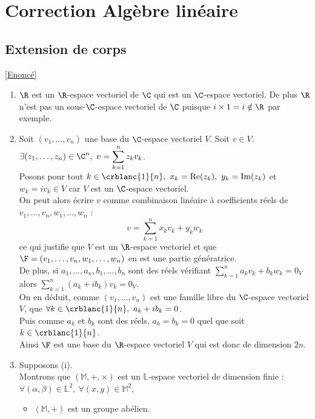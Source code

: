 \documentclass[8pt]{book}
\begin{document}
\section{Correction Algèbre linéaire}
	\subsection{Extension de corps }
	\label{Extension de corps corrigé}
	\textcolor{blue}{\hyperref[Extension de corps]{[Enoncé]}}\\
	\begin{enumerate}[leftmargin=*]
		\item $\R$ est un $\R$-espace vectoriel de $\C$ qui est un $\C$-espace vectoriel. De plus $\R$ n'est pas un sous-$\C$-espace vectoriel de $\C$ puisque $i\times 1=i\notin \R$ par exemple.
		\item Soit $(v_1,\dots,v_n)$ une base du $\C$-espace vectoriel $V$. Soit $v\in V$.\\
		$\exists (z_1,\dots,z_n)\in \C^n,\ v=\displaystyle\sum_{k=1}^nz_kv_k$.\\
		Posons pour tout $k\in \crblanc{1}{n},\ x_k=\operatorname{Re}(z_k),\ y_k=\operatorname{Im}(z_k)$ et $w_k=iv_k\in V$ car $V$ est un $\C$-espace vectoriel.\\
		On peut alors écrire $v$ comme combinaison linéaire à coefficients réels de $v_1,\dots,v_n,w_1,\dots,w_n$ :
		$$v=\sum_{k=1}^nx_kv_k+y_kw_k$$
		ce qui justifie que $V$ est un $\R$-espace vectoriel et que $\F=(v_1,\dots,v_n,w_1,\dots,w_n)$ en est une partie génératrice.\\
		De plus, si $a_1,\dots,a_n,b_1,\dots,b_n$ sont des réels vérifiant $\displaystyle\sum_{k=1}^na_kv_k+b_kw_k=0_V$ alors $\displaystyle\sum_{k=1}^n(a_k+ib_k)v_k=0_V$.\\
		On en déduit, comme $(v_1,\dots,v_n)$ est une famille libre du $\C$-espace vectoriel $V$, que $\forall k\in \crblanc{1}{n},\ a_k+ib_k=0$.\\
		Puis comme $a_k$ et $b_k$ sont des réels, $a_k=b_k=0$ quel que soit $k\in \crblanc{1}{n}$.\\
		Ainsi $\F$ est une base du $\R$-espace vectoriel $V$ qui est donc de dimension $2n$.
		\item Supposons (i).\\
		Montrons que $(\mathbb M,+,\times)$ est un $\mathbb L$-espace vectoriel de dimension finie : $\forall (\alpha,\beta)\in \mathbb L^2,\ \forall (x,y)\in \mathbb M^2$,
		\begin{itemize}
			\item $(\mathbb M,+)$ est un groupe abélien.

\end{itemize}
\end{enumerate}
\end{document}
